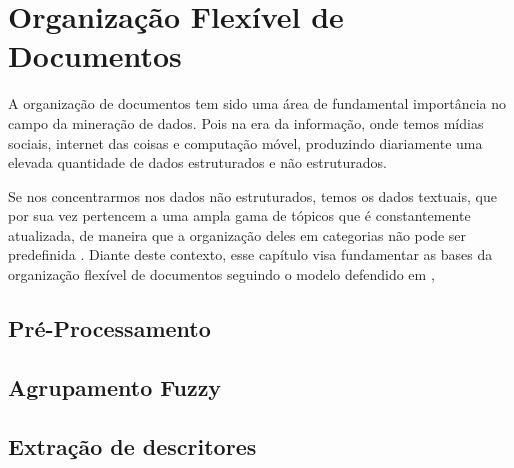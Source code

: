 \section{Organização Flexível de Documentos}

A organização de documentos tem sido uma área de fundamental importância no campo da
mineração de dados. Pois na era da informação, onde temos mídias sociais, internet das coisas
e computação móvel, produzindo diariamente uma elevada quantidade de dados estruturados e 
não estruturados. 

Se nos concentrarmos nos dados não estruturados, temos os dados textuais,
que por sua vez pertencem a uma ampla gama de tópicos que é constantemente atualizada, de maneira
que a organização deles em categorias não pode ser predefinida \cite{Carvalho2016}. 
Diante deste contexto, esse capítulo visa fundamentar as bases da organização flexível de documentos 
seguindo o modelo defendido em \cite{Nogueira2013},


\subsection{Pré-Processamento}
\subsection{Agrupamento Fuzzy}
\subsection{Extração de descritores}
